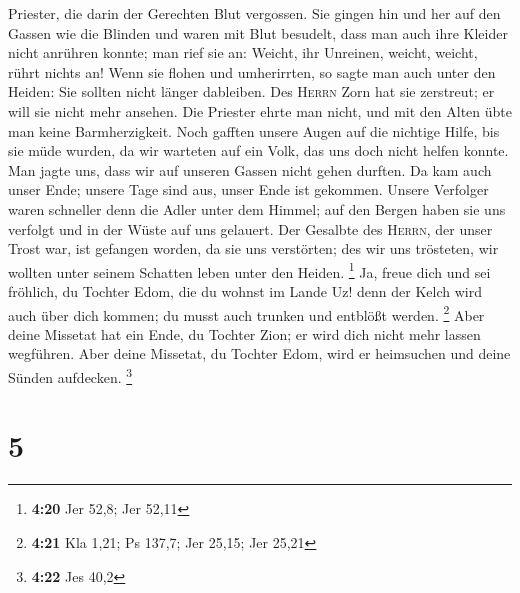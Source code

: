 Priester, die darin der Gerechten Blut vergossen.  Sie
gingen hin und her auf den Gassen wie die Blinden und waren mit Blut
besudelt, dass man auch ihre Kleider nicht anrühren konnte;
 man rief sie an: Weicht, ihr Unreinen, weicht, weicht,
rührt nichts an! Wenn sie flohen und umherirrten, so sagte man auch
unter den Heiden: Sie sollten nicht länger dableiben. 
Des \textsc{Herrn} Zorn hat sie zerstreut; er will sie nicht mehr
ansehen. Die Priester ehrte man nicht, und mit den Alten übte man keine
Barmherzigkeit.  Noch gafften unsere Augen auf die
nichtige Hilfe, bis sie müde wurden, da wir warteten auf ein Volk, das
uns doch nicht helfen konnte.  Man jagte uns, dass wir
auf unseren Gassen nicht gehen durften. Da kam auch unser Ende; unsere
Tage sind aus, unser Ende ist gekommen.  Unsere Verfolger
waren schneller denn die Adler unter dem Himmel; auf den Bergen haben
sie uns verfolgt und in der Wüste auf uns gelauert.  Der
Gesalbte des \textsc{Herrn}, der unser Trost war, ist gefangen worden,
da sie uns verstörten; des wir uns trösteten, wir wollten unter seinem
Schatten leben unter den Heiden. \footnote{\textbf{4:20} Jer 52,8; Jer
  52,11}  Ja, freue dich und sei fröhlich, du Tochter
Edom, die du wohnst im Lande Uz! denn der Kelch wird auch über dich
kommen; du musst auch trunken und entblößt werden. \footnote{\textbf{4:21}
  Kla 1,21; Ps 137,7; Jer 25,15; Jer 25,21}  Aber deine
Missetat hat ein Ende, du Tochter Zion; er wird dich nicht mehr lassen
wegführen. Aber deine Missetat, du Tochter Edom, wird er heimsuchen und
deine Sünden aufdecken. \footnote{\textbf{4:22} Jes 40,2}

\hypertarget{section-1}{%
\section{5}\label{section-1}}

